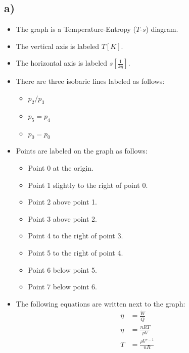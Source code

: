 

\subsection*{a)}

\begin{itemize}
    \item The graph is a Temperature-Entropy ($T$-$s$) diagram.
    \item The vertical axis is labeled $T [K]$.
    \item The horizontal axis is labeled $s \left[ \frac{1}{kg} \right]$.
    \item There are three isobaric lines labeled as follows:
        \begin{itemize}
            \item $p_2/p_3$
            \item $p_5 = p_4$
            \item $p_0 = p_0$
        \end{itemize}
    \item Points are labeled on the graph as follows:
        \begin{itemize}
            \item Point 0 at the origin.
            \item Point 1 slightly to the right of point 0.
            \item Point 2 above point 1.
            \item Point 3 above point 2.
            \item Point 4 to the right of point 3.
            \item Point 5 to the right of point 4.
            \item Point 6 below point 5.
            \item Point 7 below point 6.
        \end{itemize}
    \item The following equations are written next to the graph:
        \begin{align*}
            \eta &= \frac{\dot{W}}{\dot{Q}} \\
            \eta &= \frac{nRT}{pV} \\
            T &= \frac{\rho V^{\gamma-1}}{nR}
        \end{align*}
\end{itemize}